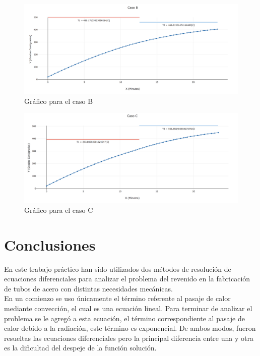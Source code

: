 \documentclass[10pt,a4paper]{article}
\begin{document}
\begin{figure}[H]
\centering
\includegraphics[width=18cm]{Grafica-ej5-casob.png}
\caption{Gráfico para el caso B}
\end{figure}

\begin{figure}[H]
\centering
\includegraphics[width=18cm]{Grafica-ej5-casoc.png}
\caption{Gráfico para el caso C}
\end{figure}
\section{Conclusiones}

En este trabajo práctico han sido utilizados dos métodos de resolución de ecuaciones diferenciales para analizar el problema del revenido en la fabricación de tubos de acero con distintas necesidades mecánicas.\\

En un comienzo se uso únicamente el término referente al pasaje de calor mediante convección, el cual es una ecuación lineal. Para terminar de analizar el problema se le agregó a esta ecuación, el término correspondiente al pasaje de calor debido a la radiación, este término es exponencial.
De ambos modos, fueron resueltas las ecuaciones diferenciales pero la principal diferencia entre una y otra es la dificultad del despeje de la función solución.\\
\end{document}
